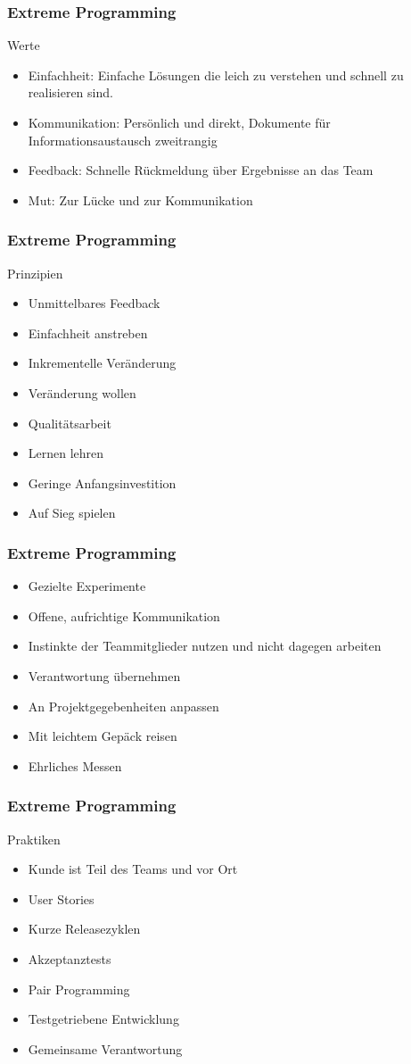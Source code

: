\begin{frame}
\frametitle{Extreme Programming}
	Werte
	\begin{itemize}
		\item Einfachheit: Einfache Lösungen die leich zu verstehen und schnell zu realisieren sind.
		\item Kommunikation: Persönlich und direkt, Dokumente für Informationsaustausch zweitrangig
		\item Feedback: Schnelle Rückmeldung über Ergebnisse an das Team
		\item Mut: Zur Lücke und zur Kommunikation
	\end{itemize}
\end{frame}

\begin{frame}
\frametitle{Extreme Programming}
	Prinzipien
	\begin{itemize}
		\item Unmittelbares Feedback
		\item Einfachheit anstreben
		\item Inkrementelle Veränderung
		\item Veränderung wollen
		\item Qualitätsarbeit
		\item Lernen lehren
		\item Geringe Anfangsinvestition
		\item Auf Sieg spielen
	\end{itemize}
\end{frame}

\begin{frame}
\frametitle{Extreme Programming}
	\begin{itemize}
		\item Gezielte Experimente
		\item Offene, aufrichtige Kommunikation
		\item Instinkte der Teammitglieder nutzen und nicht dagegen arbeiten
		\item Verantwortung übernehmen
		\item An Projektgegebenheiten anpassen
		\item Mit leichtem Gepäck reisen
		\item Ehrliches Messen
	\end{itemize}
\end{frame}

\begin{frame}
\frametitle{Extreme Programming}
	Praktiken
	\begin{itemize}
		\item Kunde ist Teil des Teams und vor Ort
		\item User Stories
		\item Kurze Releasezyklen
		\item Akzeptanztests
		\item Pair Programming
		\item Testgetriebene Entwicklung
		\item Gemeinsame Verantwortung
	\end{itemize}
\end{frame}

